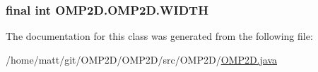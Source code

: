 \hypertarget{classOMP2D_1_1OMP2D_ac885e11e3f91b4a1c2d7c4b997d48047}{
\subsubsection[{W\-I\-D\-T\-H}]{\setlength{\rightskip}{0pt plus 5cm}final int O\-M\-P2\-D.\-O\-M\-P2\-D.\-W\-I\-D\-T\-H\hspace{0.3cm}{\ttfamily [private]}}}\label{classOMP2D_1_1OMP2D_ac885e11e3f91b4a1c2d7c4b997d48047}


The documentation for this class was generated from the following file\-:\begin{DoxyCompactItemize}
\item 
/home/matt/git/\-O\-M\-P2\-D/\-O\-M\-P2\-D/src/\-O\-M\-P2\-D/\hyperlink{OMP2D_8java}{O\-M\-P2\-D.\-java}\end{DoxyCompactItemize}
